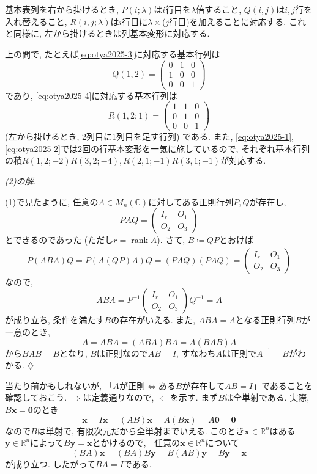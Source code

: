 \documentclass[titlepage]{jsarticle}
\numberwithin{equation}{section}
\newcommand{\R}{\mathbb{R}}%
\newcommand{\C}{\mathbb{C}}%
\newcommand{\rank}{\operatorname{rank}}
\newenvironment{kaitou}[1][解]{%
\begin{proofbox}%
\textit{#1. }\ignorespaces
}{%
\hfill$\diamondsuit$%
\end{proofbox}%
}
\begin{document}
基本表列を右から掛けるとき, $P(i; \lambda)$は$i$行目を$\lambda$倍すること, $Q(i, j)$は$i, j$行を入れ替えること, $R(i, j;\lambda)$は$i$行目に$\lambda\times$($j$行目)を加えることに対応する. これと同様に, 左から掛けるときは列基本変形に対応する.
\begin{marker}
上の問で, たとえば\eqref{eq:otya2025-3}に対応する基本行列は
\[
Q(1, 2)=
\begin{pmatrix}
0 & 1 & 0\\
1 & 0 & 0\\
0 & 0 & 1
\end{pmatrix}
\]
であり, \eqref{eq:otya2025-4}に対応する基本行列は
\[
R(1, 2; 1)
=
\begin{pmatrix}
1 & 1 & 0\\
0 & 1 & 0\\
0 & 0 & 1
\end{pmatrix}
\]
(左から掛けるとき, 2列目に1列目を足す行列) である. また, \eqref{eq:otya2025-1}, \eqref{eq:otya2025-2}では2回の行基本変形を一気に施しているので, それぞれ基本行列の積$R(1, 2;-2)R(3,2;-4), R(2, 1;-1)R(3, 1;-1)$が対応する.
\end{marker}
\begin{kaitou}[(2)の解]
(1)で見たように, 任意の$A \in M_n(\C)$に対してある正則行列$P, Q$が存在し, 
\[
PAQ=
\begin{pmatrix}
        I_r & O_1\\
        O_2 & O_3
\end{pmatrix}
\]
とできるのであった (ただし$r = \rank A$). さて, $B \coloneq QP$とおけば
\begin{align*}
P(ABA)Q = P(A(QP)A)Q = (PAQ)(PAQ) = 
    \begin{pmatrix}
        I_r & O_1\\
        O_2 & O_3
    \end{pmatrix}
\end{align*}
なので,
\[
ABA =
P^{-1}
\begin{pmatrix}
I_r & O_1\\
O_2 & O_3
\end{pmatrix}
Q^{-1}
= A 
\]
が成り立ち, 条件を満たす$B$の存在がいえる. また, $ABA = A$となる正則行列$B$が一意のとき,
\[
A = ABA = (ABA)BA = A(BAB)A 
\]
から$BAB = B$となり, $B$は正則なので$AB = I$, すなわち$A$は正則で$A^{-1} = B$がわかる.
\end{kaitou}
\begin{marker}
当たり前かもしれないが, 「$A$が正則$\iff$ある$B$が存在して$AB = I$」であることを確認しておこう. $\Rightarrow$は定義通りなので, $\Leftarrow$を示す. まず$B$は全単射である. 実際, $B\bm{x} = \bm{0}$のとき
\[
\bm{x} = I\bm{x} = (AB)\bm{x} = A(B\bm{x}) = A\bm{0} = \bm{0}
\]
なので$B$は単射で, 有限次元だから全単射までいえる. このとき$\bm{x} \in \R^n$はある$\bm{y}\in \R^n$によって$B\bm{y} = \bm{x}$とかけるので,　任意の$\bm{x} \in \R^n$について
\[
(BA)\bm{x} = (BA)B\bm{y} = B(AB)\bm{y} = B\bm{y} = \bm{x}
\]
が成り立つ. したがって$BA = I$である.
\end{marker}
\end{document}
